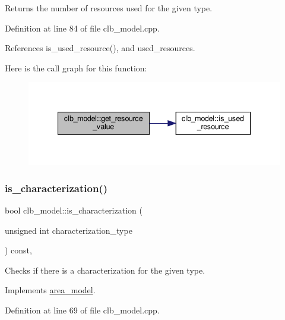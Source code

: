 Returns the number of resources used for the given type. 



Definition at line 84 of file clb\+\_\+model.\+cpp.



References is\+\_\+used\+\_\+resource(), and used\+\_\+resources.

Here is the call graph for this function\+:
\nopagebreak
\begin{figure}[H]
\begin{center}
\leavevmode
\includegraphics[width=340pt]{d6/d39/classclb__model_ae64d71f3b4302b41235c66b98075639e_cgraph}
\end{center}
\end{figure}
\mbox{\label{classclb__model_a409409e7c08050412c0153d376ce50ec}} 
\subsubsection{\texorpdfstring{is\+\_\+characterization()}{is\_characterization()}}
{\footnotesize\ttfamily bool clb\+\_\+model\+::is\+\_\+characterization (\begin{DoxyParamCaption}\item[{unsigned int}]{characterization\+\_\+type }\end{DoxyParamCaption}) const\hspace{0.3cm}{\ttfamily [override]}, {\ttfamily [virtual]}}



Checks if there is a characterization for the given type. 



Implements \hyperlink{classarea__model_ae885ec3d0b487d31fd2e7537dd588ce3}{area\+\_\+model}.



Definition at line 69 of file clb\+\_\+model.\+cpp.

